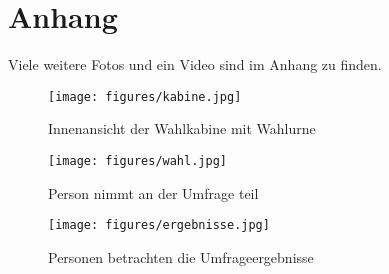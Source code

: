 \section{Anhang}

Viele weitere Fotos und ein Video sind im Anhang zu finden.

\begin{figure}[ht]
    \centering
    \texttt{[image: figures/kabine.jpg]}
    \caption{Innenansicht der Wahlkabine mit Wahlurne}
    \label{fig:kabine}
\end{figure}

\begin{figure}[ht]
    \centering
    \texttt{[image: figures/wahl.jpg]}
    \caption{Person nimmt an der Umfrage teil}
    \label{fig:wahl}
\end{figure}

\begin{figure}[ht]
    \centering
    \texttt{[image: figures/ergebnisse.jpg]}
    \caption{Personen betrachten die Umfrageergebnisse}
    \label{fig:umfrageergebnisse}
\end{figure}